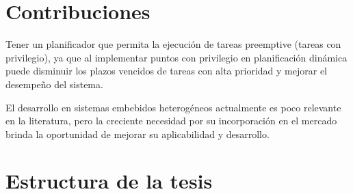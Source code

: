 
\section{Contribuciones}

Tener un planificador que permita la ejecución de tareas preemptive (tareas con privilegio), ya que al implementar puntos con privilegio en planificación dinámica puede disminuir los plazos vencidos de tareas con alta prioridad y mejorar el desempeño del sistema.

El desarrollo en sistemas embebidos heterogéneos actualmente es poco relevante en la literatura, pero la creciente necesidad por su incorporación en el mercado brinda la oportunidad de mejorar su aplicabilidad y desarrollo. 



\section {Estructura de la tesis}


